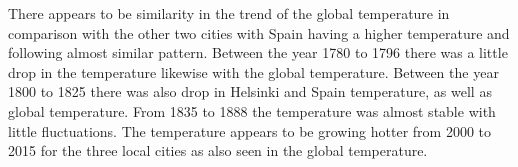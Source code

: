 \documentclass[10pt,a4paper]{article}
\begin{document}
\noindent There appears to be similarity in the trend of the global temperature in comparison with the other two cities with Spain having a higher temperature and  following almost similar pattern. Between the year 1780 to 1796 there was a little drop in the temperature likewise with the global temperature. Between the year 1800 to 1825 there was also drop in Helsinki and Spain temperature, as well as global temperature. From 1835 to 1888 the temperature was almost stable with little fluctuations. The temperature appears to be growing hotter from 2000 to 2015 for the three local cities as also seen in the global temperature.
\end{document}
